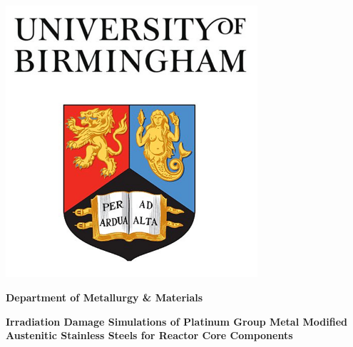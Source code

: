 \begin{titlepage}
  \begin{center}   
    \centerline{\includegraphics[width=0.7\textwidth]{cover/Cover_Art}}    
    
    
    \textbf{Department of Metallurgy \& Materials}   
    
    \vspace*{1.0cm}       
    \Large{}    
    \textbf{Irradiation Damage Simulations of Platinum Group Metal Modified Austenitic Stainless Steels for Reactor Core Components}
    \vspace{0.8cm}   
    \normalsize{}
    
    \vfill        
    
  \end{center}
\end{titlepage}

\afterpage{\blankpage}